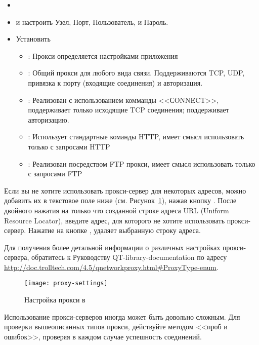 \begin{itemize}
\item {}
\item {} и
настроить Узел, Порт, Пользователь, и Пароль.
\item Установить 
 \begin{itemize}
  \item {}: Прокси определяется настройками
  приложения
  \item {}: Общий прокси для любого вида связи.
  Поддерживаются TCP, UDP, привязка к порту (входящие соединения) и
  авторизация.
  \item {}: Реализован с использованием комманды
  <<СONNECT>>, поддерживает только исходящие TCP соединения; поддерживает
  авторизацию.
  \item {}: Использует стандартные команды
  HTTP, имеет смысл использовать только с запросами HTTP
  \item {}: Реализован посредством FTP прокси,
  имеет смысл использовать только с запросами FTP
 \end{itemize}
\end{itemize}

Если вы не хотите использовать прокси-сервер для некоторых адресов, можно
добавить их в текстовое поле ниже (см. Рисунок~\ref{fig:proxy-settings}),
нажав кнопку . После двойного нажатия на только что
созданной строке адреса URL (Uniform Resource Locator), введите адрес,
для которого не хотите использовать прокси-сервер. Нажатие на кнопке
, удаляет выбранную строку адреса.

Для получения более детальной информации о различных настройках прокси-сервера,
обратитесь к Руководству QT-library-documentation по адресу \\
\url{http://doc.trolltech.com/4.5/qnetworkproxy.html#ProxyType-enum}.

\begin{figure}[ht]
   \centering
   \texttt{[image: proxy-settings]}
   \caption{Настройка прокси в \qg \nixcaption}
   \label{fig:proxy-settings}
\end{figure}

\begin{Tip} \caption{\textsc{Использование прокси-серверов}}
Использование прокси-серверов иногда может быть довольно сложным. Для
проверки вышеописанных типов прокси, действуйте методом <<проб и ошибок>>,
проверяя в каждом случае успешность соединений.
\end{Tip}


